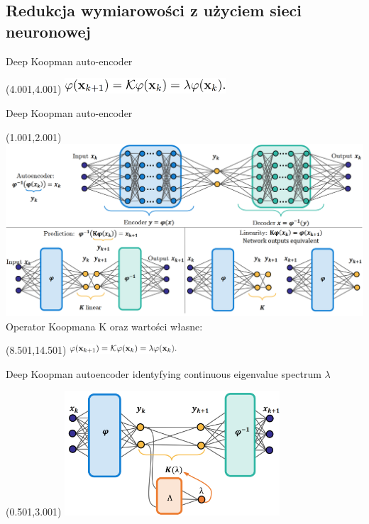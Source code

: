 \documentclass[aspectratio=169]{beamer}
\begin{document}
\subsection{Redukcja wymiarowości z użyciem sieci neuronowej}
\begin{frame} {Deep Koopman auto-encoder}
\begin{textblock}{18}(4.001,4.001)
	\includegraphics[width=6cm]{imgs/koopman.png}
\end{textblock}
\end{frame}

\begin{frame} {Deep Koopman auto-encoder}
\begin{textblock}{18}(1.001,2.001)
	\includegraphics[width=14cm]{imgs/deepKoopman.png} \\ 
	Operator Koopmana K oraz wartości własne:
\end{textblock}
\begin{textblock}{18}(8.501,14.501)
	\includegraphics[width=4cm]{imgs/koopman.png}
\end{textblock}
\end{frame}

\begin{frame} {Deep Koopman autoencoder identyfying continuous eigenvalue
		spectrum $\lambda$}
\begin{textblock}{18}(0.501,3.001)
	\includegraphics[width=8cm]{imgs/frequencyKoopman.png}
\end{textblock}
\end{frame}
\end{document}
